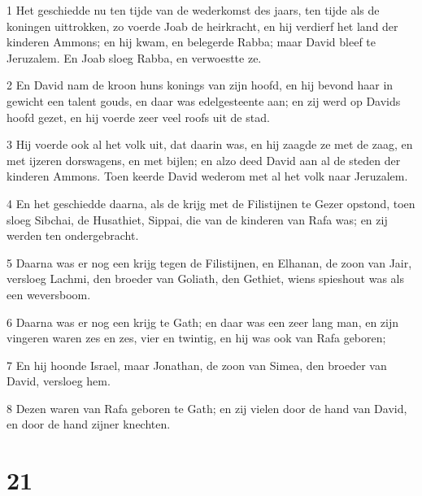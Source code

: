 \par 1 Het geschiedde nu ten tijde van de wederkomst des jaars, ten tijde als de koningen uittrokken, zo voerde Joab de heirkracht, en hij verdierf het land der kinderen Ammons; en hij kwam, en belegerde Rabba; maar David bleef te Jeruzalem. En Joab sloeg Rabba, en verwoestte ze.
\par 2 En David nam de kroon huns konings van zijn hoofd, en hij bevond haar in gewicht een talent gouds, en daar was edelgesteente aan; en zij werd op Davids hoofd gezet, en hij voerde zeer veel roofs uit de stad.
\par 3 Hij voerde ook al het volk uit, dat daarin was, en hij zaagde ze met de zaag, en met ijzeren dorswagens, en met bijlen; en alzo deed David aan al de steden der kinderen Ammons. Toen keerde David wederom met al het volk naar Jeruzalem.
\par 4 En het geschiedde daarna, als de krijg met de Filistijnen te Gezer opstond, toen sloeg Sibchai, de Husathiet, Sippai, die van de kinderen van Rafa was; en zij werden ten ondergebracht.
\par 5 Daarna was er nog een krijg tegen de Filistijnen, en Elhanan, de zoon van Jair, versloeg Lachmi, den broeder van Goliath, den Gethiet, wiens spieshout was als een weversboom.
\par 6 Daarna was er nog een krijg te Gath; en daar was een zeer lang man, en zijn vingeren waren zes en zes, vier en twintig, en hij was ook van Rafa geboren;
\par 7 En hij hoonde Israel, maar Jonathan, de zoon van Simea, den broeder van David, versloeg hem.
\par 8 Dezen waren van Rafa geboren te Gath; en zij vielen door de hand van David, en door de hand zijner knechten.

\chapter{21}

